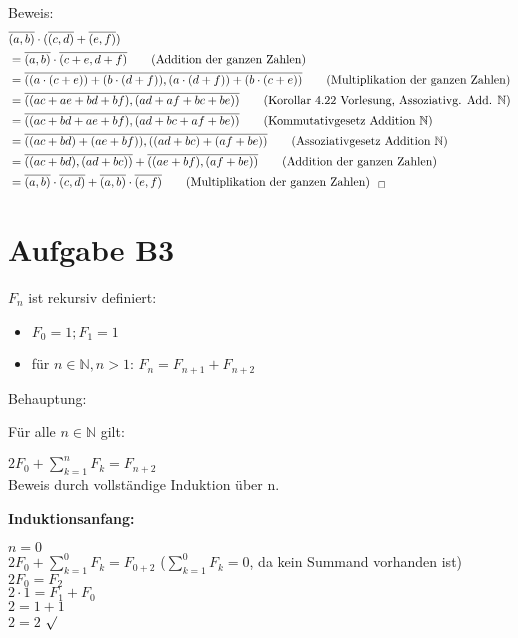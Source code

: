 \documentclass[11pt,a4paper]{article}
\begin{document}
Beweis:
\begin{align*}
& \overline{(a,b)} \cdot ( \overline{(c,d)} + \overline{(e,f)} )\\
& = \overline{(a,b)} \cdot \overline{(c+e,d+f)}   \tag{Addition der ganzen Zahlen}\\
& = \overline{((a \cdot (c+e)) + (b \cdot (d+f)), (a \cdot (d+f))+ (b \cdot (c+e))}   \tag{Multiplikation der ganzen Zahlen} \\
& = \overline{((ac+ae+bd+bf),(ad+af+bc+be))}   \tag{Korollar 4.22 Vorlesung, Assoziativg. Add. $\mathbb{N}$}\\
& = \overline{((ac+bd+ae+bf),(ad+bc+af+be))}  \tag{Kommutativgesetz Addition $\mathbb{N}$}\\
& = \overline{((ac+bd)+(ae+bf)),((ad+bc)+(af+be))}   \tag{Assoziativgesetz Addition $\mathbb{N}$}\\
& = \overline{((ac+bd),(ad+bc))} + \overline{((ae+bf),(af+be))}   \tag{Addition der ganzen Zahlen}\\
& = \overline{(a,b)} \cdot \overline{(c,d)} + \overline{(a,b)} \cdot \overline{(e,f)} \tag{Multiplikation der ganzen Zahlen}  ~~_\Box\\
\end{align*}
\section*{Aufgabe B3}

$F_n$ ist rekursiv definiert:
\begin{itemize}
\item $F_0 = 1 ; F_1 = 1$
\item für $n \in \mathbb{N}, n > 1$: $F_n = F_{n+1} + F_{n+2}$
\end{itemize}
Behauptung:

Für alle $ n \in \mathbb{N}$ gilt:

$ 2F_0 + \sum \limits_{k=1}^n F_k = F_{n+2}$ \\

Beweis durch vollständige Induktion über n.

\textbf{Induktionsanfang:}

$ n = 0$ \\
$ 2F_0 + \sum \limits_{k=1}^0 F_k = F_{0+2}$ ($ \sum \limits_{k=1}^0 F_k = 0$, da kein Summand vorhanden ist) \\
$2F_0 = F_2$ \\
$2\cdot1 = F_1 + F_0$\\
$2 = 1 + 1$ \\
$2 = 2$ $\surd$ \\
\end{document}
